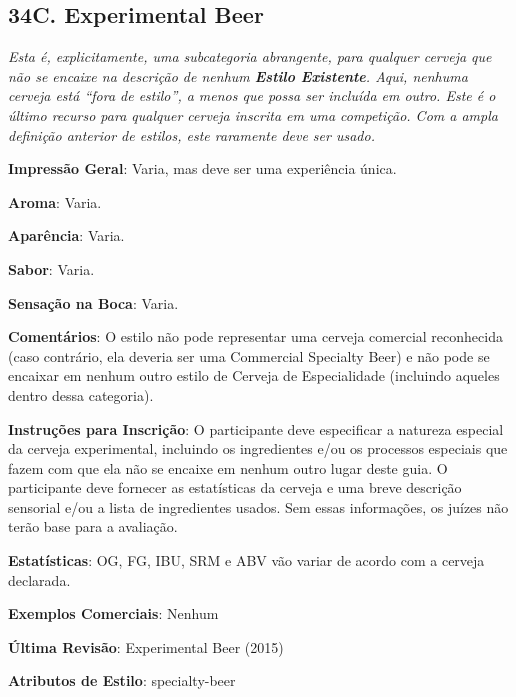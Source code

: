 \subsection*{34C. Experimental Beer}
\textit{Esta é, explicitamente, uma subcategoria abrangente, para qualquer cerveja que não se encaixe na descrição de nenhum \textbf{Estilo Existente}. Aqui, nenhuma cerveja está “fora de estilo”, a menos que possa ser incluída em outro. Este é o último recurso para qualquer cerveja inscrita em uma competição. Com a ampla definição anterior de estilos, este raramente deve ser usado.}

\textbf{Impressão Geral}: Varia, mas deve ser uma experiência única.

\textbf{Aroma}: Varia.

\textbf{Aparência}: Varia.

\textbf{Sabor}: Varia.

\textbf{Sensação na Boca}: Varia.

\textbf{Comentários}: O estilo não pode representar uma cerveja comercial reconhecida (caso contrário, ela deveria ser uma Commercial Specialty Beer) e não pode se encaixar em nenhum outro estilo de Cerveja de Especialidade (incluindo aqueles dentro dessa categoria).

\textbf{Instruções para Inscrição}: O participante deve especificar a natureza especial da cerveja experimental, incluindo os ingredientes e/ou os processos especiais que fazem com que ela não se encaixe em nenhum outro lugar deste guia. O participante deve fornecer as estatísticas da cerveja e uma breve descrição sensorial e/ou a lista de ingredientes usados. Sem essas informações, os juízes não terão base para a avaliação.

\textbf{Estatísticas}: OG, FG, IBU, SRM e ABV vão variar de acordo com a cerveja declarada.

\textbf{Exemplos Comerciais}: Nenhum

\textbf{Última Revisão}: Experimental Beer (2015)

\textbf{Atributos de Estilo}: specialty-beer
